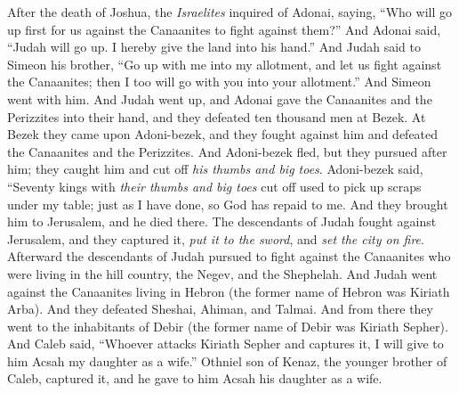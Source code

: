 
\begin{biblechapter} %
 After the death of Joshua, the \textit{Israelites} inquired of Adonai, saying, “Who will go up first for us against the Canaanites to fight against them?”
\verse And Adonai said, “Judah will go up. I hereby give the land into his hand.”
\verse And Judah said to Simeon his brother, “Go up with me into my allotment, and let us fight against the Canaanites; then I too will go with you into your allotment.” And Simeon went with him.
\verse And Judah went up, and Adonai gave the Canaanites and the Perizzites into their hand, and they defeated ten thousand men at Bezek.
\verse At Bezek they came upon Adoni-bezek, and they fought against him and defeated the Canaanites and the Perizzites.
\verse And Adoni-bezek fled, but they pursued after him; they caught him and cut off \textit{his thumbs and big toes}.
\verse Adoni-bezek said, “Seventy kings with \textit{their thumbs and big toes} cut off used to pick up scraps under my table; just as I have done, so God has repaid to me. And they brought him to Jerusalem, and he died there.
\verse The descendants of Judah fought against Jerusalem, and they captured it, \textit{put it to the sword}, and \textit{set the city on fire}.
\verse Afterward the descendants of Judah pursued to fight against the Canaanites who were living in the hill country, the Negev, and the Shephelah.
\verse And Judah went against the Canaanites living in Hebron (the former name of Hebron was Kiriath Arba). And they defeated Sheshai, Ahiman, and Talmai.
\verse And from there they went to the inhabitants of Debir (the former name of Debir was Kiriath Sepher).
\verse And Caleb said, “Whoever attacks Kiriath Sepher and captures it, I will give to him Acsah my daughter as a wife.”
\verse Othniel son of Kenaz, the younger brother of Caleb, captured it, and he gave to him Acsah his daughter as a wife.

\end{biblechapter}
